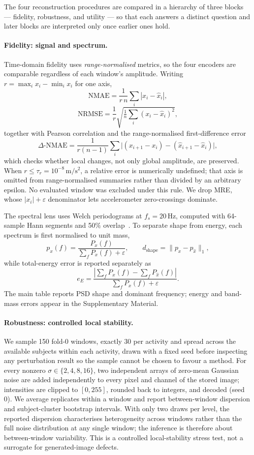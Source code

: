 \documentclass[preprint,12pt]{elsarticle}
\begin{document}
The four reconstruction procedures are compared in a hierarchy of three blocks --- fidelity, robustness, and utility --- so that each answers a distinct question and later blocks are interpreted only once earlier ones hold.

\paragraph{Fidelity: signal and spectrum.}\label{sec:fidelity_metrics}
Time-domain fidelity uses \emph{range-normalised} metrics, so the four encoders are comparable regardless of each window's amplitude. Writing \(r=\max_i x_i-\min_i x_i\) for one axis,
\[
\mathrm{NMAE}=\frac{1}{r\,n}\sum_i|x_i-\hat x_i|,
\]
\[
\mathrm{NRMSE}=\frac{1}{r}\sqrt{\tfrac1n\sum_i{(x_i-\hat x_i)}^2},
\]
together with Pearson correlation and the range-normalised first-difference error
\[
\Delta\text{-NMAE}=\frac{1}{r(n-1)}\sum_i\bigl|(x_{i+1}-x_i)-(\hat x_{i+1}-\hat x_i)\bigr|,
\]
which checks whether local changes, not only global amplitude, are preserved. When \(r\le\tau_r=10^{-8}\,\mathrm{m/s^2}\), a relative error is numerically undefined; that axis is omitted from range-normalised summaries rather than divided by an arbitrary epsilon. No evaluated window was excluded under this rule. We drop MRE, whose \(|x_i|+\varepsilon\) denominator lets accelerometer zero-crossings dominate.

The spectral lens uses Welch periodograms at \(f_s=20\,\)Hz, computed with 64-sample Hann segments and 50\% overlap~\cite{Welch1967}. To separate shape from energy, each spectrum is first normalised to unit mass,
\[
p_x(f)=\frac{P_x(f)}{\sum_f P_x(f)+\varepsilon},\qquad
d_{\mathrm{shape}}=\lVert p_x-p_{\hat x}\rVert_1,
\]
while total-energy error is reported separately as
\[
e_E=\frac{|\sum_f P_x(f)-\sum_f P_{\hat x}(f)|}{\sum_f P_x(f)+\varepsilon}.
\]
The main table reports PSD shape and dominant frequency; energy and band-mass errors appear in the Supplementary Material.

\paragraph{Robustness: controlled local stability.}
We sample 150 fold-0 windows, exactly 30 per activity and spread across the available subjects within each activity, drawn with a fixed seed before inspecting any perturbation result so the sample cannot be chosen to favour a method. For every nonzero \(\sigma\in\{2,4,8,16\}\), two independent arrays of zero-mean Gaussian noise are added independently to every pixel and channel of the stored image; intensities are clipped to \([0,255]\), rounded back to integers, and decoded (seed 0). We average replicates within a window and report between-window dispersion and subject-cluster bootstrap intervals. With only two draws per level, the reported dispersion characterises heterogeneity across windows rather than the full noise distribution at any single window; the inference is therefore about between-window variability. This is a controlled local-stability stress test, not a surrogate for generated-image defects.
\end{document}
